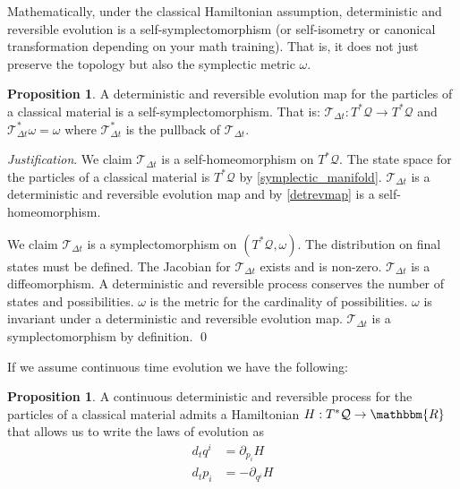 \documentclass[aps,pra,10pt,twocolumn,floatfix,nofootinbib]{revtex4-1}
\numberwithin{equation}{section}
\theoremstyle{definition}
\newtheorem{prop}[equation]{Proposition}
\newenvironment{justification}{\emph{Justification}.}{\qed}
\begin{document}
Mathematically, under the classical Hamiltonian assumption,  deterministic and reversible evolution is a self-symplectomorphism (or self-isometry or canonical transformation depending on your math training). That is, it does not just preserve the topology but also the symplectic metric $\omega$.

\begin{prop}\label{canonical_transformation}
	A deterministic and reversible evolution map for the particles of a classical material is a self-symplectomorphism. That is: $\mathcal{T}_{\Delta t}: T^*\mathcal{Q} \rightarrow T^*\mathcal{Q}$ and $\mathcal{T}_{\Delta t}^*\omega = \omega$ where $\mathcal{T}_{\Delta t}^*$ is the pullback of $\mathcal{T}_{\Delta t}$.
\end{prop}

\begin{justification}
	We claim $\mathcal{T}_{\Delta t}$ is a self-homeomorphism on $T^*\mathcal{Q}$. The state space for the particles of a classical material is $T^*\mathcal{Q}$ by \ref{symplectic_manifold}. $\mathcal{T}_{\Delta t}$ is a deterministic and reversible evolution map and by \ref{detrevmap} is a self-homeomorphism.
	
	We claim $\mathcal{T}_{\Delta t}$ is a symplectomorphism on $(T^*\mathcal{Q}, \omega)$. The distribution on final states must be defined. The Jacobian for $\mathcal{T}_{\Delta t}$ exists and is non-zero. $\mathcal{T}_{\Delta t}$ is a diffeomorphism. A deterministic and reversible process conserves the number of states and possibilities. $\omega$ is the metric for the cardinality of possibilities. $\omega$ is invariant under a deterministic and reversible evolution map. $\mathcal{T}_{\Delta t}$ is a symplectomorphism by definition.
\end{justification}

If we assume continuous time evolution we have the following:

\begin{prop}\label{hamiltons_equations}
	A continuous deterministic and reversible process for the particles of a classical material admits a Hamiltonian $H: T^*\mathcal{Q} \rightarrow \mathbbm{R}$ that allows us to write the laws of evolution as
\begin{align*}
d_{t}q^i &= \partial_{p_i} H \\
d_{t}p_i &= - \partial_{q^i} H
\end{align*}
\end{prop}
\end{document}
